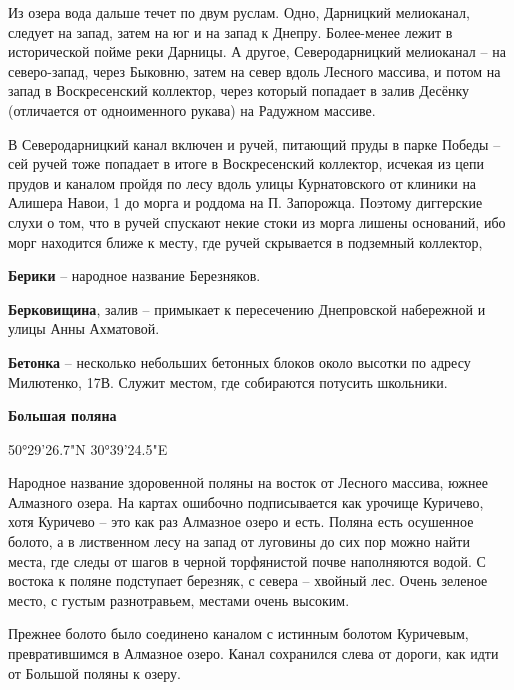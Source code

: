 Из озера вода дальше течет по двум руслам. Одно, Дарницкий мелиоканал, следует на запад, затем на юг и на запад к Днепру. Более-менее лежит в исторической пойме реки Дарницы. А другое, Северодарницкий мелиоканал – на северо-запад, через Быковню, затем на север вдоль Лесного массива, и потом на запад в Воскресенский коллектор, через который попадает в залив Десёнку (отличается от одноименного рукава) на Радужном массиве. 

В Северодарницкий канал включен и ручей, питающий пруды в парке Победы – сей ручей тоже попадает в итоге в Воскресенский коллектор, исчекая из цепи прудов и каналом пройдя по лесу вдоль улицы Курнатовского от клиники на Алишера Навои, 1 до морга и роддома на П. Запорожца. Поэтому диггерские слухи о том, что в ручей спускают некие стоки из морга лишены оснований, ибо морг находится ближе к месту, где ручей скрывается в подземный коллектор, \\

\medskip

\textbf{Берики} – народное название Березняков.\\

\medskip

\textbf{Берковищина}, залив – примыкает к пересечению Днепровской набережной и 
улицы Анны Ахматовой.\\

\medskip

\textbf{Бетонка} – несколько небольших бетонных блоков около высотки по адресу Милютенко, 17В. Служит местом, где собираются потусить школьники.\\

\medskip

\textbf{Большая поляна}

50°29'26.7"N 30°39'24.5"E

Народное название здоровенной поляны на восток от Лесного массива, южнее Алмазного озера. На картах ошибочно подписывается как урочище Куричево, хотя Куричево – это как раз Алмазное озеро и есть. Поляна есть осушенное болото, а в лиственном лесу на запад от луговины до сих пор можно найти места, где следы от шагов в черной торфянистой почве наполняются водой. С востока к поляне подступает березняк, с севера – хвойный лес. Очень зеленое место, с густым разнотравьем, местами очень высоким.

Прежнее болото было соединено каналом с истинным болотом Куричевым, превратившимся в Алмазное озеро. Канал сохранился слева от дороги, как идти от Большой поляны к озеру.

